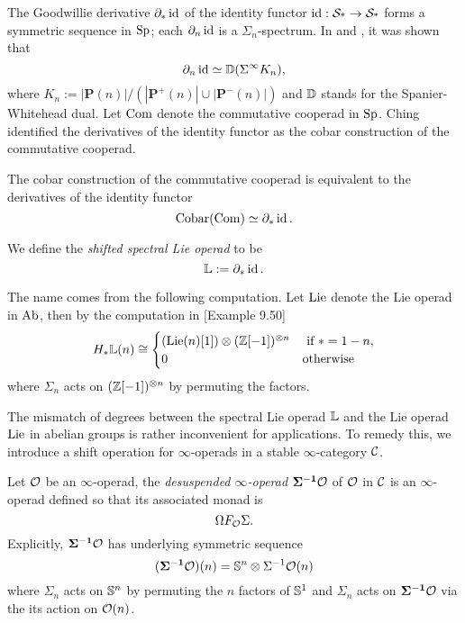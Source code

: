 	The Goodwillie derivative $\partial_* \operatorname{id}$ of the identity functor $\operatorname{id}: \operatorname{\mathcal{S}_{*}} \to \operatorname{\mathcal{S}_{*}}$ forms a symmetric sequence in $\operatorname{Sp}$; each $\partial_n \operatorname{id}$ is a $\Sigma_n$-spectrum. In \cite{JohnsonDerivative} and \cite{Arone-Mahowald}, it was shown that
	$$
	\partial_n \operatorname{id} \simeq {\mathbb{D}}(\Sigma^{\infty} K_n),
	$$
	where 
	$
	K_{n}:=|\mathbf{P}(n)| /\left(\left|\mathbf{P}^{+}(n)\right| \cup\left|\mathbf{P}^{-}(n)\right|\right)
	$
	and ${\mathbb{D}}$ stands for the Spanier-Whitehead dual. 
	Let $\operatorname{Com}$ denote the commutative cooperad in $\operatorname{Sp}$.
	Ching \cite{ChingBar} identified the derivatives of the identity functor as the cobar construction of the commutative cooperad.
	\begin{proposition}
	\cite[Remark 8.9]{ChingBar}
	The cobar construction of the commutative cooperad is equivalent to the derivatives of the identity functor
	$$
	\operatorname{Cobar}(\operatorname{Com})\simeq \partial_* \operatorname{id}.
	$$
	\end{proposition}
	
	\begin{definition}
	\label{Shifted Spectral Lie Operad}
	    	We define the \emph{shifted spectral Lie operad} to be
	    	$$
	    	{\mathbb{L}}:= \partial_* \operatorname{id}.
	    	$$
	\end{definition}

	The name comes from the following computation. Let $\operatorname{Lie}$ denote the Lie operad in $\operatorname{Ab}$, then by the computation in \cite{ChingBar}[Example 9.50]
	$$
	H_{*}{\mathbb{L}}(n) \cong 	
	\begin{cases}
	(\operatorname{Lie}(n)[1])\otimes ({\mathbb{Z}}[-1])^{\otimes n}& \text{ if $*=1-n$},\\
	0 & \text{otherwise}
	\end{cases}
	$$	
	where $\Sigma_n$ acts on $({\mathbb{Z}}[-1])^{\otimes n}$ by permuting the factors. 


The mismatch of degrees between the spectral Lie operad ${\mathbb{L}}$ and the Lie operad $\operatorname{Lie}$ in abelian groups is rather inconvenient for applications. To remedy this, we introduce a shift operation for $\infty$-operads in a stable $\infty$-category ${\mathcal{C}}$. 
\begin{definition}
\cite[Section 3]{Camarena_mod2_free_spectral_Lie_algebra}
    Let ${\mathcal{O}}$ be an $\infty$-operad, the \emph{desuspended $\infty$-operad} $\bf{\Sigma}^{-1} {\mathcal{O}}$ of ${\mathcal{O}}$ in ${\mathcal{C}}$ is an $\infty$-operad  defined so that its associated monad is
	$$
	\Omega F_{{\mathcal{O}}}\Sigma.
	$$
	Explicitly, $\bf{\Sigma}^{-1} {\mathcal{O}}$ has underlying symmetric sequence 
	$$
	(\mathbf{\Sigma^{-1}} {\mathcal{O}} ) (n)= {\mathbb{S}}^{n}\otimes\Sigma^{-1} {\mathcal{O}}(n)
	$$
	where $\Sigma_n$ acts on ${\mathbb{S}}^{n}$ by permuting the $n$ factors of ${\mathbb{S}}^{1}$ and $\Sigma_n$ acts on $\mathbf{\Sigma^{-1}} {\mathcal{O}}$ via the its action on ${\mathcal{O}}(n)$.
\end{definition}


